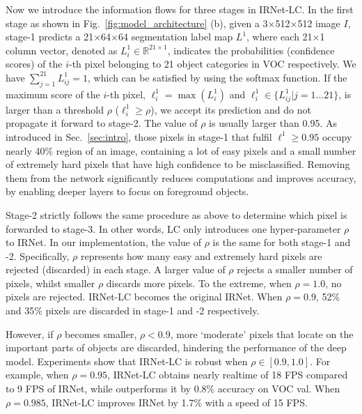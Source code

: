 \documentclass[10pt,twocolumn,letterpaper]{article}
\begin{document}
Now we introduce the information flows for three stages in IRNet-LC.
In the first stage as shown in Fig.~\ref{fig:model_architecture} (b), given a 3$\times$512$\times$512 image $I$, stage-1 predicts a 21$\times$64$\times$64 segmentation label map $L^1$, where each 21$\times$1 column vector, denoted as $L^1_i\in\mathbb{R}^{21\times1}$, indicates the probabilities (confidence scores) of the $i$-th pixel
belonging to 21 object categories in VOC respectively.
We have $\sum_{j=1}^{21} L^1_{ij}=1$, which can be satisfied by using the softmax function.
If the maximum score of the $i$-th pixel, $\ell^1_i=\max(L^1_{i})$ and $\ell^1_i\in\{L^1_{ij}|j=1...21\}$, is larger than a threshold $\rho$ ($\ell^1_i\geq\rho$), we accept its prediction and do not propagate it forward to stage-2.
The value of $\rho$ is usually larger than 0.95.
As introduced in Sec.~\ref{sec:intro}, those pixels in stage-1 that fulfil $\ell^1\geq0.95$ occupy nearly 40\% region of an image, containing a lot of easy pixels and a small number of extremely hard pixels that have high confidence to be misclassified.
Removing them from the network significantly reduces computations and improves accuracy, by
enabling deeper layers to focus on foreground objects.

Stage-2 strictly follows the same procedure as above to determine which pixel is forwarded to stage-3.
In other words, LC only introduces one hyper-parameter $\rho$ to IRNet.
In our implementation, the value of $\rho$ is the same for both stage-1 and -2.
Specifically, $\rho$ represents how many easy and extremely hard pixels are rejected (discarded) in each stage.
A larger value of $\rho$ rejects a smaller number of pixels, whilst smaller $\rho$ discards more pixels.
To the extreme, when $\rho=1.0$, no pixels are rejected. IRNet-LC becomes the original IRNet.
When $\rho=0.9$, 52\% and 35\% pixels are discarded in stage-1 and -2 respectively.


However, if $\rho$ becomes smaller, \ie $\rho<0.9$, more `moderate' pixels that locate on the important parts of objects are discarded, hindering the performance of the deep model.
Experiments show that IRNet-LC is robust when $\rho\in[0.9,1.0]$.
For example, when $\rho=0.95$, IRNet-LC obtains nearly realtime of 18 FPS compared to 9 FPS of IRNet, while outperforms it by 0.8\% accuracy on VOC val.
When $\rho=0.985$, IRNet-LC improves IRNet by 1.7\% with a speed of 15 FPS.
\end{document}
